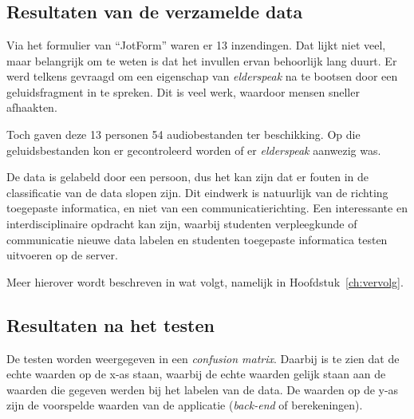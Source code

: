 
\chapter{}
\label{ch:resultaten}

\section{Resultaten van de verzamelde data}
Via het formulier van ``JotForm'' waren er 13 inzendingen. Dat lijkt niet veel, maar belangrijk om te weten is dat het invullen ervan behoorlijk lang duurt. Er werd telkens gevraagd om een eigenschap van \textit{elderspeak} na te bootsen door een geluidsfragment in te spreken. Dit is veel werk, waardoor mensen sneller afhaakten.

Toch gaven deze 13 personen 54 audiobestanden ter beschikking. Op die geluidsbestanden kon er gecontroleerd worden of er \textit{elderspeak} aanwezig was.

De data is gelabeld door een persoon, dus het kan zijn dat er fouten in de classificatie van de data slopen zijn. Dit eindwerk is natuurlijk van de richting toegepaste informatica, en niet van een communicatierichting. Een interessante en interdisciplinaire opdracht kan zijn, waarbij studenten verpleegkunde of communicatie nieuwe data labelen en studenten toegepaste informatica testen uitvoeren op de server.

Meer hierover wordt beschreven in wat volgt, namelijk in Hoofdstuk~\ref{ch:vervolg}.

\section{Resultaten na het testen}
De testen worden weergegeven in een \textit{confusion matrix}. Daarbij is te zien dat de echte waarden op de x-as staan, waarbij de echte waarden gelijk staan aan de waarden die gegeven werden bij het labelen van de data. De waarden op de y-as zijn de voorspelde waarden van de applicatie (\textit{back-end} of berekeningen).

